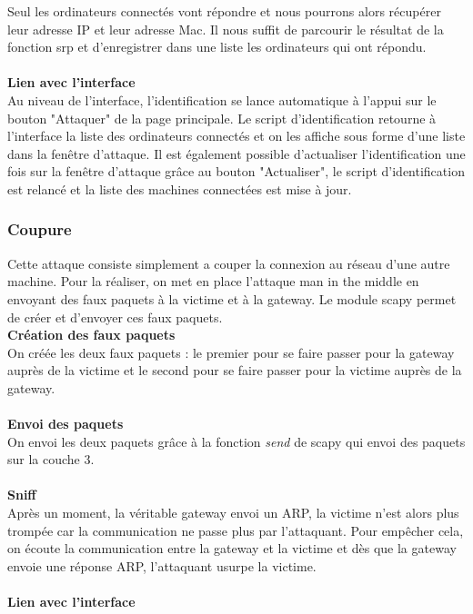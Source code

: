 \documentclass[11pt]{article}
\begin{document}
Seul les ordinateurs connectés vont répondre et nous pourrons alors récupérer leur adresse IP et leur adresse Mac. Il nous suffit de parcourir le résultat de la fonction srp et d'enregistrer dans une liste les ordinateurs qui ont répondu.~\\
~\\
\textbf{Lien avec l'interface}~\\

Au niveau de l'interface, l'identification se lance automatique à l'appui sur le bouton "Attaquer" de la page principale. Le script d'identification retourne à l'interface la liste des ordinateurs connectés et on les affiche sous forme d'une liste dans la fenêtre d'attaque. Il est également possible d'actualiser l'identification une fois sur la fenêtre d'attaque grâce au bouton "Actualiser", le script d'identification est relancé et la liste des machines connectées est mise à jour.

\subsubsection{Coupure}
Cette attaque consiste simplement a couper la connexion au réseau d'une autre machine. Pour la réaliser, on met en place l'attaque man in the middle en envoyant des faux paquets à la victime et à la gateway. Le module scapy permet de créer et d'envoyer ces faux paquets.~\\

\textbf{Création des faux paquets}~\\

On créée les deux faux paquets : le premier pour se faire passer pour la gateway auprès de la victime et le second pour se faire passer pour la victime auprès de la gateway.~\\
~\\
\textbf{Envoi des paquets}~\\

On envoi les deux paquets grâce à la fonction \textit{send} de scapy qui envoi des paquets sur la couche 3.~\\
~\\
\textbf{Sniff}~\\

Après un moment, la véritable gateway envoi un ARP, la victime n'est alors plus trompée car la communication ne passe plus par l'attaquant. Pour empêcher cela, on écoute la communication entre la gateway et la victime et dès que la gateway envoie une réponse ARP, l'attaquant usurpe la victime.~\\
~\\
\textbf{Lien avec l'interface}~\\
\end{document}
